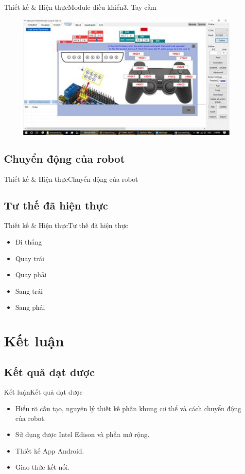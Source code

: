 \documentclass[compress, blue, 13pt,hyperref={pdfpagemode=FullScreen}]{beamer}
\begin{document}
\begin{frame}{Thiết kế \& Hiện thực}{Module điều khiển}{3. Tay cầm}
\transblindshorizontal
\begin{figure}[hbtp]
\centering
\includegraphics[scale=0.7]{images/image007.jpg}
\end{figure}
\end{frame}
\subsection{Chuyển động của robot}
\begin{frame}{Thiết kế \& Hiện thực}{Chuyển động của robot}

\end{frame}
\subsection{Tư thế đã hiện thực}
\begin{frame}{Thiết kế \& Hiện thực}{Tư thế đã hiện thực}
\transblindshorizontal
\begin{itemize}
\item Đi thẳng
\item Quay trái
\item Quay phải
\item Sang trái
\item Sang phải
\end{itemize}
\end{frame}
\section{Kết luận}
\subsection{Kết quả đạt được}
\begin{frame}{Kết luận}{Kết quả đạt được}
\transblindshorizontal
\begin{itemize}
\item Hiểu rõ cấu tạo, nguyên lý thiết kế phần khung cơ thể và cách chuyển động của robot.
\pause
\item Sử dụng được Intel Edison và phần mở rộng.
\pause
\item Thiết kế App Android.
\pause
\item Giao thức kết nối.
\end{itemize}
\end{frame}
\end{document}
